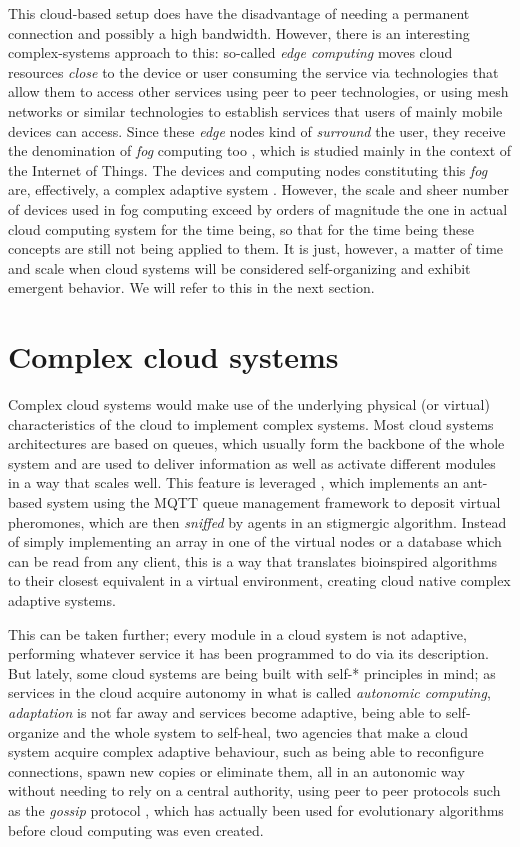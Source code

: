 \documentclass[utf8]{frontiersSCNS} %
\begin{document}
This cloud-based setup does have the disadvantage of needing a
permanent connection and possibly a high bandwidth. However, there is
an interesting complex-systems approach to this: so-called {\em edge
computing} \citep{satyanarayanan2017edge} moves cloud resources {\em close} to
the device or user consuming the service via technologies that allow them to access other
services using peer to peer technologies, or using mesh networks or
similar technologies to establish services that users of mainly mobile
devices can access. Since these {\em edge} nodes kind of {\em surround} the
user, they receive the denomination of {\em fog} computing too
\citep{luan2015fog}, which is studied mainly in the context of the Internet
of Things. The devices and computing nodes constituting this {\em fog}
are, effectively, a complex adaptive system \citep{yan2010application,roca2018tackling}. However, the scale and sheer
number of devices used in fog computing exceed by orders of magnitude
the one in actual cloud computing system for the time being, so that
for the time being these concepts are still not being applied to
them. It is just, however, a matter of time and scale when cloud
systems will be considered self-organizing and exhibit emergent
behavior. We will refer to this in the next section.


\section{Complex cloud systems }

Complex cloud systems would make use of the underlying physical (or
virtual) characteristics of the cloud to implement complex
systems. Most cloud systems architectures are based on queues, which
usually form the backbone of the whole system and are used to deliver
information as well as activate different modules in a way that scales
well. This feature is leveraged \citep{bottone2016implementing}, which
implements an ant-based system using the MQTT queue management
framework to deposit virtual pheromones, which are then {\em sniffed} by
agents in an stigmergic algorithm. Instead of simply implementing an
array in one of the virtual nodes or a database which can be read from
any client, this is a way that translates bioinspired algorithms to
their closest equivalent in a virtual environment, creating cloud
native complex adaptive systems. 

This can be taken further; every module in a cloud system is not
adaptive, performing whatever service it has been programmed to do via
its description. But lately, some cloud systems are being built with
self-* principles in mind; as services in the cloud acquire autonomy
in what is called {\em autonomic computing}, {\em adaptation} is not far away
and services become adaptive, being able to self-organize and the
whole system to self-heal, two agencies that make a cloud system
acquire complex adaptive behaviour, such as being able to reconfigure
connections, spawn new copies or eliminate them, all in an autonomic
way without needing to rely on a central authority, using peer to peer
protocols such as the {\em gossip} protocol \citep{LNCS44480129}, which has
actually been used for evolutionary algorithms \citep{laredo09cache} before
cloud computing was even created.
\end{document}
